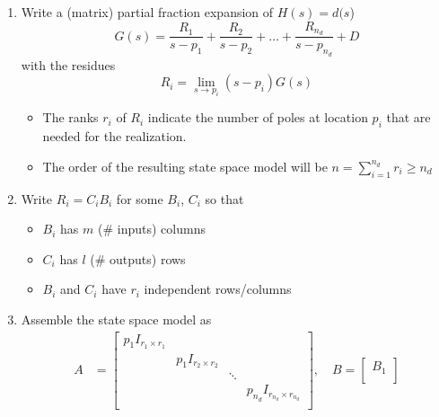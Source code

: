 \begin{enumerate}
    \item Write a (matrix) partial fraction expansion of $H(s)=d(s$)
          \begin{equation*}
              G(s)=\frac{R_1}{s-p_1}+\frac{R_2}{s-p_2}+\ldots+\frac{R_{n_d}}{s-p_{n_d}}+D
          \end{equation*} with the residues
          \begin{equation*}
              R_i=\lim_{s\to p_i}(s-p_i)G(s)
          \end{equation*}
          \begin{itemize}
              \item The ranks $r_i$ of $R_i$ indicate the number of poles at location $p_i$ that are needed for the realization.
              \item The order of the resulting state space model will be $n=\sum_{i=1}^{n_d}r_i\geq n_d$
          \end{itemize}
    \item Write $R_i=C_i B_i$ for some $B_i$, $C_i$ so that
          \begin{itemize}
              \item $B_i$ has $m$ (\# inputs) columns
              \item $C_i$ has $l$ (\# outputs) rows
              \item $B_i$ and $C_i$ have $r_i$ independent rows/columns
          \end{itemize}
    \item Assemble the state space model as
          \begin{align*}
              A & =\begin{bmatrix}
                       p_1 I_{r_1\times r_1} &                       &        &                                   \\
                                             & p_1 I_{r_2\times r_2} &        &                                   \\
                                             &                       & \ddots &                                   \\
                                             &                       &        & p_{n_d} I_{r_{n_d}\times r_{n_d}} \\
                   \end{bmatrix},\quad
              B =\begin{bmatrix}
                     B_1     \\

\end{bmatrix}
\end{align*}
\end{enumerate}
